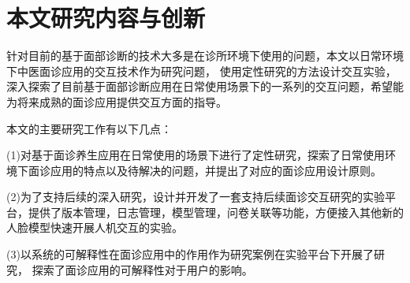 











\section{本文研究内容与创新}

针对目前的基于面部诊断的技术大多是在诊所环境下使用的问题，本文以日常环境下中医面诊应用的交互技术作为研究问题，
使用定性研究的方法设计交互实验，深入探索了目前基于面部诊断应用在日常使用场景下的一系列的交互问题，希望能为将来成熟的面诊应用提供交互方面的指导。

本文的主要研究工作有以下几点：

(1)对基于面诊养生应用在日常使用的场景下进行了定性研究，探索了日常使用环境下面诊应用的特点以及待解决的问题，并提出了对应的面诊应用设计原则。

(2)为了支持后续的深入研究，设计并开发了一套支持后续面诊交互研究的实验平台，提供了版本管理，日志管理，模型管理，问卷关联等功能，方便接入其他新的人脸模型快速开展人机交互的实验。

(3)以系统的可解释性在面诊应用中的作用作为研究案例在实验平台下开展了研究， 探索了面诊应用的可解释性对于用户的影响。



